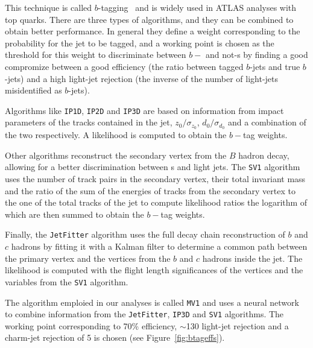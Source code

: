 This technique is called $b$-tagging~\cite{ref:ATLAS-CONF-2011-102} and is
widely used in ATLAS analyses with top quarks. There are three types of algorithms,
and they can be combined to obtain better performance. In general they define a weight
corresponding to the probability for the jet to be tagged, and a working point is chosen
as the threshold for this weight to discriminate between $b-$ and not-\bjet s
by finding a good compromize between a good efficiency (the ratio between tagged
$b$-jets and true $b$-jets) and a high light-jet rejection
(the inverse of the number of light-jets misidentified as $b$-jets).

Algorithms like \texttt{IP1D}, \texttt{IP2D} and \texttt{IP3D} are
based on information from impact parameters of the tracks
contained in the jet, $z_0/\sigma_{z_0}$, $d_0/\sigma_{d_0}$ and a
combination of the two respectively. A likelihood is computed to
obtain the $b-$tag weights.

Other algorithms reconstruct the secondary vertex from the $B$ hadron
decay, allowing for a better discrimination between \bjet s and light
jets. The \texttt{SV1} algorithm uses the number of track pairs in
the secondary vertex, their total invariant mass and the ratio of
the sum of the energies of tracks from the secondary vertex to the one
of the total tracks of the jet to compute likelihood ratios the logarithm
of which are then summed to obtain the $b-$tag weights.

Finally, the \texttt{JetFitter} algorithm uses the full decay chain reconstruction
of $b$ and $c$ hadrons by fitting it with a Kalman filter to determine a 
common path between the primary vertex and the vertices from the $b$ and $c$ hadrons 
inside the jet. The likelihood is computed with the flight length significances
of the vertices and the variables from the  \texttt{SV1} algorithm.

The algorithm emploied in our analyses is called \texttt{MV1} and uses
a neural network to combine information from the \texttt{JetFitter}, \texttt{IP3D}
and \texttt{SV1} algorithms.
The working point corresponding to 70\% efficiency, 
$\sim$130 light-jet rejection and a charm-jet rejection of 5 is 
chosen (see Figure~\ref{fig:btageffs}).

